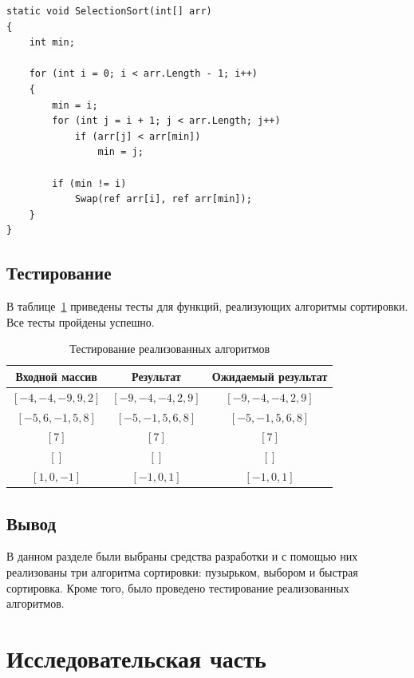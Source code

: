 \documentclass[12pt]{report}
\begin{document}
\begin{lstlisting}[label=some-code,caption=Функция сортировки массива выбором]
static void SelectionSort(int[] arr)
{
	int min;
	
	for (int i = 0; i < arr.Length - 1; i++)
	{
		min = i;
		for (int j = i + 1; j < arr.Length; j++)
			if (arr[j] < arr[min])
				min = j;
		
		if (min != i)
			Swap(ref arr[i], ref arr[min]);
	}
}
\end{lstlisting}


\section{Тестирование}

В таблице~\ref{tbl:test} приведены тесты для функций, реализующих алгоритмы сортировки. Все тесты пройдены успешно.

\begin{table}[h!]
	\begin{center}
	\caption{\label{tbl:test}Тестирование реализованных алгоритмов}
		\begin{tabular}{|c|c|c|}
		
			\hline
			Входной массив & Результат & Ожидаемый результат \\ 
			\hline
			$[-4, -4, -9, 9, 2]$ & $[-9, -4, -4, 2, 9]$  & $[-9, -4, -4, 2, 9]$\\\hline
			$[-5, 6, -1, 5, 8]$  & $[-5, -1, 5, 6, 8]$  & $[-5, -1, 5, 6, 8]$\\\hline
			$[7]$  & $[7]$  & $[7]$\\\hline
			$[]$  & $[]$  & $[]$\\\hline
			$[1, 0, -1]$  & $[-1, 0, 1]$  & $[-1, 0, 1]$\\\hline
		\end{tabular}
		
	\end{center}
\end{table}

\section{Вывод}

В данном разделе были выбраны средства разработки и с помощью них реализованы три алгоритма сортировки: пузырьком, выбором и быстрая сортировка. Кроме того, было проведено тестирование реализованных алгоритмов.

\chapter{Исследовательская часть}
\end{document}
